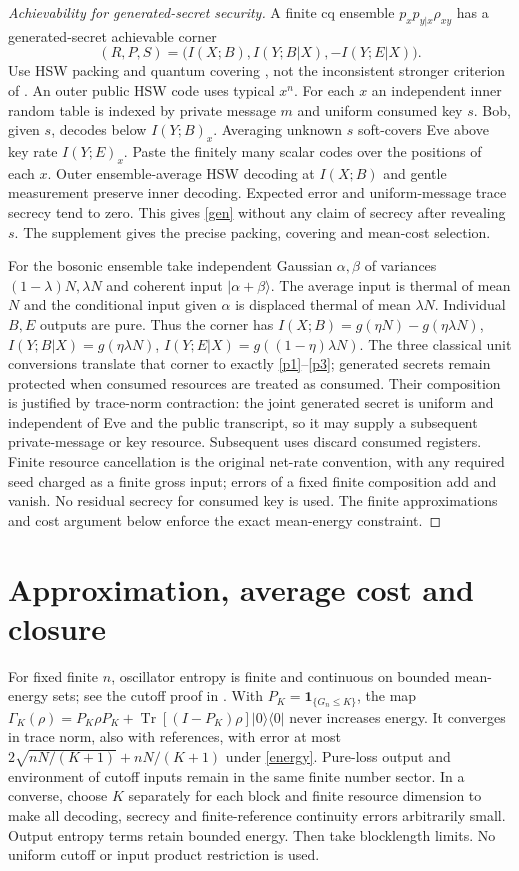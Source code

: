 \documentclass[11pt]{article}
\newcommand{\Tr}{\operatorname{Tr}}
\begin{document}
\begin{proof}[Achievability for generated-secret security]
A finite cq ensemble $p_xp_{y|x}\rho_{xy}$ has a generated-secret
achievable corner
\[
 (R,P,S)=\bigl(I(X;B),I(Y;B|X),-I(Y;E|X)\bigr).
\]
Use HSW packing and quantum covering \cite{DEV,HLB,HN}, not the
inconsistent stronger criterion of \cite{PEPF}.
An outer public HSW code uses typical $x^n$. For each $x$ an
independent inner random table is indexed by private message $m$
and uniform consumed key $s$. Bob, given $s$, decodes below
$I(Y;B)_x$. Averaging unknown $s$ soft-covers Eve above key
rate $I(Y;E)_x$. Paste the finitely many scalar codes over
the positions of each $x$. Outer ensemble-average HSW decoding
at $I(X;B)$ and gentle measurement preserve inner decoding.
Expected error and uniform-message trace secrecy tend to zero.
This gives \eqref{gen} without any claim of secrecy after
revealing $s$. The supplement gives the precise packing,
covering and mean-cost selection.

For the bosonic ensemble take independent Gaussian
$\alpha,\beta$ of variances $(1-\lambda)N,\lambda N$ and
coherent input $|\alpha+\beta\rangle$.
The average input is thermal of mean $N$ and the conditional
input given $\alpha$ is displaced thermal of mean $\lambda N$.
Individual $B,E$ outputs are pure. Thus the corner has
$I(X;B)=g(\eta N)-g(\eta\lambda N)$,
$I(Y;B|X)=g(\eta\lambda N)$,
$I(Y;E|X)=g((1-\eta)\lambda N)$.
The three classical unit conversions translate that corner
to exactly \eqref{p1}--\eqref{p3}; generated secrets remain
protected when consumed resources are treated as consumed.
Their composition is justified by trace-norm contraction: the joint
generated secret is uniform and independent of Eve and the public
transcript, so it may supply a subsequent private-message or key
resource. Subsequent uses discard consumed registers. Finite resource
cancellation is the original net-rate convention, with any required
seed charged as a finite gross input; errors of a fixed finite
composition add and vanish. No residual secrecy for consumed key is
used.
The finite approximations and cost argument below enforce
the exact mean-energy constraint.
\end{proof}

\section{Approximation, average cost and closure}\label{approx}
For fixed finite $n$, oscillator entropy is finite and continuous
on bounded mean-energy sets; see the cutoff proof in
\cite[Lemma 2.2]{OAI}. With $P_K=\mathbf1_{\{G_n\le K\}}$, the map
$\Gamma_K(\rho)=P_K\rho P_K+
\Tr[(I-P_K)\rho]|0\rangle\langle0|$ never increases energy.
It converges in trace norm, also with references, with error at most
$2\sqrt{nN/(K+1)}+nN/(K+1)$ under \eqref{energy}.
Pure-loss output and environment of cutoff inputs remain in the
same finite number sector. In a converse, choose $K$ separately
for each block and finite resource dimension to make all decoding,
secrecy and finite-reference continuity errors arbitrarily small.
Output entropy terms retain bounded energy. Then take blocklength
limits. No uniform cutoff or input product restriction is used.
\end{document}
